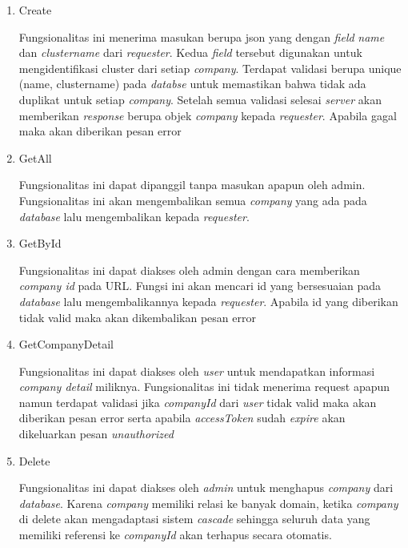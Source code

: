 \begin{enumerate}
  \item Create

        Fungsionalitas ini menerima masukan berupa json yang dengan \textit{field} \textit{name} dan \textit{cluster\textunderscore name} dari \textit{requester}. Kedua \textit{field} tersebut digunakan untuk mengidentifikasi cluster dari setiap \textit{company}. Terdapat validasi berupa unique (name, cluster\textunderscore name) pada \textit{databse} untuk memastikan bahwa tidak ada duplikat untuk setiap \textit{company}. Setelah semua validasi selesai \textit{server} akan memberikan \textit{response} berupa objek \textit{company} kepada \textit{requester}. Apabila gagal maka akan diberikan pesan error

  \item GetAll

        Fungsionalitas ini dapat dipanggil tanpa masukan apapun oleh admin. Fungsionalitas ini akan mengembalikan semua \textit{company} yang ada pada \textit{database} lalu mengembalikan kepada \textit{requester}.

  \item GetById

        Fungsionalitas ini dapat diakses oleh admin dengan cara memberikan \textit{company id} pada URL. Fungsi ini akan mencari id yang bersesuaian pada \textit{database} lalu mengembalikannya kepada \textit{requester}. Apabila id yang diberikan tidak valid maka akan dikembalikan pesan error

  \item GetCompanyDetail

        Fungsionalitas ini dapat diakses oleh \textit{user} untuk mendapatkan informasi \textit{company detail} miliknya. Fungsionalitas ini tidak menerima request apapun namun terdapat validasi jika \textit{companyId} dari \textit{user} tidak valid maka akan diberikan pesan error serta apabila \textit{accessToken} sudah \textit{expire} akan dikeluarkan pesan \textit{unauthorized}

  \item Delete

        Fungsionalitas ini dapat diakses oleh \textit{admin} untuk menghapus \textit{company} dari \textit{database}. Karena \textit{company} memiliki relasi ke banyak domain, ketika \textit{company} di delete akan mengadaptasi sistem \textit{cascade} sehingga seluruh data yang memiliki referensi ke \textit{companyId} akan terhapus secara otomatis.

\end{enumerate}


